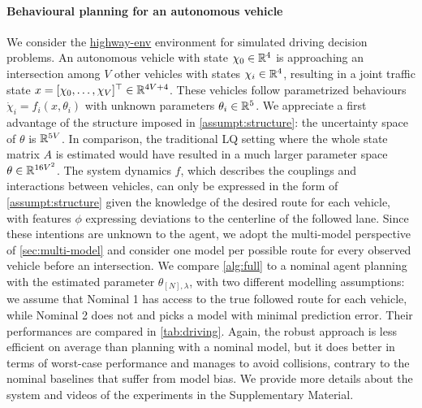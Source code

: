 \documentclass{article}
\begin{document}
\paragraph{Behavioural planning for an autonomous vehicle}
We consider the \href{https://github.com/eleurent/highway-env}{highway-env} environment \citep{highway-env} for simulated driving decision problems. An autonomous vehicle with state $\chi_0\in\mathbb{R}^4$ is approaching an intersection among $V$ other vehicles with states $\chi_i\in\mathbb{R}^4$, resulting in a joint traffic state $x = [\chi_0, \dots,\chi_V]^\top\in\mathbb{R}^{4V+4}$. These vehicles follow parametrized behaviours $\dot{\chi}_i=f_i(x,\theta_i)$ with unknown parameters $\theta_i\in\mathbb{R}^5$. We appreciate a first advantage of the structure imposed in \autoref{assumpt:structure}: the uncertainty space of $\theta$ is $\mathbb{R}^{5V}$. In comparison, the traditional LQ setting where the whole state matrix $A$ is estimated would have resulted in a much larger parameter space $\theta\in\mathbb{R}^{16V^2}$.
The system dynamics $f$, which describes the couplings and interactions between vehicles, can only be expressed in the form of \autoref{assumpt:structure} given the knowledge of the desired route for each vehicle, with features $\phi$ expressing deviations to the centerline of the followed lane. Since these intentions are unknown to the agent, we adopt the multi-model perspective of \autoref{sec:multi-model} and consider one model per possible route for every observed vehicle before an intersection. We compare \autoref{alg:full} to a nominal agent planning with the estimated parameter $\theta_{[N],\lambda}$, with two different modelling assumptions: we assume that Nominal 1 has access to the true followed route for each vehicle, while Nominal 2 does not and picks a model with minimal prediction error. Their performances are compared in \autoref{tab:driving}. Again, the robust approach is less efficient on average than planning with a nominal model, but it does better in terms of worst-case performance and manages to avoid collisions, contrary to the nominal baselines that suffer from model bias. We provide more details about the system and videos of the experiments in the Supplementary Material.
\end{document}
